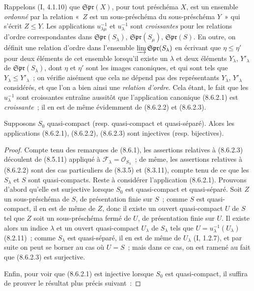 
Rappelons (I, 4.1.10) que $\mathfrak{Spr}(X)$, pour tout préschéma $X$, est un
ensemble \emph{ordonné} par la relation «~$Z$ est un sous-préschéma du
sous-préschéma $Y$~» qui s'écrit $Z\leq Y$. Les applications
$u_{\lambda\mu}^{-1}$ et $u_\lambda^{-1}$ sont \emph{croissantes} pour les
relations d'ordre correspondantes dans $\mathfrak{Spr}(S_\lambda)$,
$\mathfrak{Spr}(S_\mu)$, $\mathfrak{Spr}(S)$. En outre, on définit une relation
d'ordre dans l'ensemble $\varinjlim\mathfrak{Spr}(S_\lambda)$ en écrivant que
$\eta\leq\eta'$ pour deux éléments de cet ensemble lorsqu'il existe un
$\lambda$ et deux éléments $Y_\lambda$, $Y'_\lambda$ de
$\mathfrak{Spr}(S_\lambda)$, dont $\eta$ et $\eta'$ sont les images canoniques,
et qui sont tels que $Y_\lambda\leq Y'_\lambda$~; on vérifie aisément que cela
ne dépend pas des représentants $Y_\lambda$, $Y'_\lambda$ considérés, et que
l'on a bien ainsi une \emph{relation d'ordre}. Cela étant, le fait que les
$u_\lambda^{-1}$ sont croissantes entraîne aussitôt que l'application
canonique (8.6.2.1) est \emph{croissante}~; il en est de même évidemment de
(8.6.2.2) et (8.6.2.3).

\begin{proposition}[8.6.3]
\label{IV.8.6.3-fr}
Supposons $S_0$ quasi-compact (resp. quasi-compact et quasi-séparé). Alors les
applications (8.6.2.1), (8.6.2.2), (8.6.2.3) sont injectives (resp.
bijectives).
\end{proposition}

\begin{proof}
Compte tenu des remarques de (8.6.1), les assertions relatives à (8.6.2.3)
découlent de (8.5.11) appliqué à $\mathcal F_\lambda=\mathcal O_{S_\lambda}$~;
de même, les assertions relatives à (8.6.2.2) sont des cas particuliers de
(8.3.5) et (8.3.11), compte tenu de ce que les $S_\lambda$ et $S$ sont
quasi-compacts. Reste à considérer l'application (8.6.2.1). Prouvons d'abord
qu'elle est surjective lorsque $S_0$ est quasi-compact et quasi-séparé. Soit
$Z$ un sous-préschéma de $S$, de présentation finie sur $S$~; comme $S$ est
quasi-compact, il en est de même de $Z$, donc il existe un ouvert
quasi-compact $U$ de $S$ tel que $Z$ soit un sous-préschéma fermé de $U$, de
présentation finie sur $U$. Il existe alors un indice $\lambda$ et un ouvert
quasi-compact $U_\lambda$ de $S_\lambda$ tels que
$U=u_\lambda^{-1}(U_\lambda)$ (8.2.11)~; comme $S_\lambda$ est quasi-séparé, il
en est de même de $U_\lambda$ (I, 1.2.7), et par suite on peut se borner au cas
où $U=S$~; mais dans ce cas, on est ramené au fait que (8.6.2.3) est
surjective.

Enfin, pour voir que (8.6.2.1) est injective lorsque $S_0$ est quasi-compact,
il suffira de prouver le résultat plus précis suivant~:
\end{proof}

